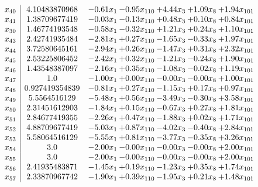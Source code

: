 \documentclass[8pt]{article}
\begin{document}
\[\begin{array}{c| c c@{\hskip 2pt} c@{\hskip 2pt} c@{\hskip 2pt} c@{\hskip 2pt} c@{\hskip 2pt} }
 x_{40}   &  4.10483870968 & -0.61 x_{1} & -0.95 x_{110} & +  4.44 x_{3} & +  1.09 x_{8} & +  1.94 x_{101}\\
 x_{41}   &  1.38709677419 & -0.03 x_{1} & -0.13 x_{110} & +  0.48 x_{3} & +  0.10 x_{8} & +  0.84 x_{101}\\
 x_{30}   &  1.46774193548 & -0.58 x_{1} & -0.32 x_{110} & +  1.21 x_{3} & +  0.24 x_{8} & +  1.10 x_{101}\\
 x_{43}   &  2.42741935484 & -2.81 x_{1} & +  0.27 x_{110} & -1.65 x_{3} & -0.33 x_{8} & +  1.97 x_{101}\\
 x_{44}   &  3.72580645161 & -2.94 x_{1} & +  0.26 x_{110} & -1.47 x_{3} & +  0.31 x_{8} & +  2.32 x_{101}\\
 x_{45}   &  2.53225806452 & -2.42 x_{1} & +  0.32 x_{110} & -1.21 x_{3} & -0.24 x_{8} & +  1.90 x_{101}\\
 x_{46}   &  1.43548387097 & -2.16 x_{1} & +  0.35 x_{110} & -1.08 x_{3} & -0.02 x_{8} & +  1.19 x_{101}\\
 x_{47}   &  1.0 & -1.00 x_{1} & +  0.00 x_{110} & -0.00 x_{3} & -0.00 x_{8} & +  1.00 x_{101}\\
 x_{48}   &  0.927419354839 & -0.81 x_{1} & +  0.27 x_{110} & -1.15 x_{3} & +  0.17 x_{8} & +  0.97 x_{101}\\
 x_{49}   &  5.5564516129 & -5.48 x_{1} & +  0.56 x_{110} & -3.49 x_{3} & -0.30 x_{8} & +  3.58 x_{101}\\
 x_{50}   &  2.31451612903 & -1.84 x_{1} & +  0.15 x_{110} & -0.67 x_{3} & +  0.27 x_{8} & +  1.81 x_{101}\\
 x_{51}   &  2.84677419355 & -2.26 x_{1} & +  0.47 x_{110} & -1.88 x_{3} & +  0.02 x_{8} & +  1.71 x_{101}\\
 x_{52}   &  4.88709677419 & -5.03 x_{1} & +  0.87 x_{110} & -4.02 x_{3} & -0.40 x_{8} & +  2.84 x_{101}\\
 x_{53}   &  5.58064516129 & -5.55 x_{1} & +  0.81 x_{110} & -3.77 x_{3} & -0.35 x_{8} & +  3.26 x_{101}\\
 x_{54}   &  3.0 & -2.00 x_{1} & -0.00 x_{110} & -0.00 x_{3} & -0.00 x_{8} & +  2.00 x_{101}\\
 x_{55}   &  3.0 & -2.00 x_{1} & -0.00 x_{110} & -0.00 x_{3} & -0.00 x_{8} & +  2.00 x_{101}\\
 x_{56}   &  2.41935483871 & -1.45 x_{1} & +  0.19 x_{110} & -1.23 x_{3} & +  0.35 x_{8} & +  1.74 x_{101}\\
 x_{57}   &  2.33870967742 & -1.90 x_{1} & +  0.39 x_{110} & -1.95 x_{3} & +  0.21 x_{8} & +  1.48 x_{101}\\

\end{array}\]
\end{document}
